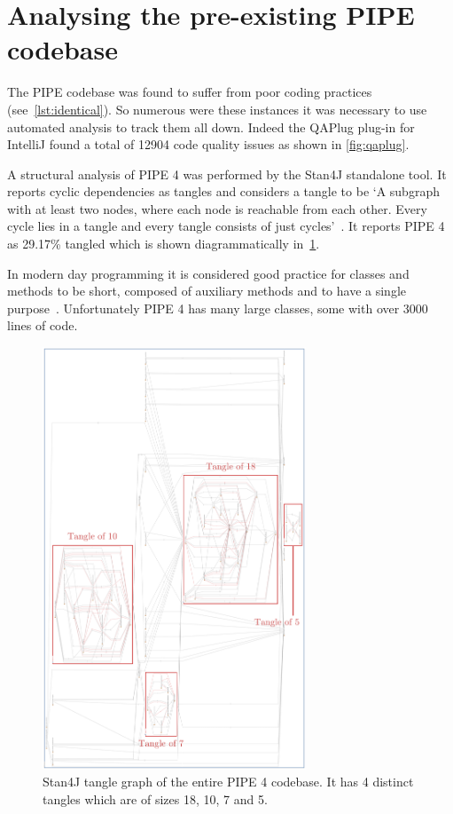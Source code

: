  \section{Analysing the pre-existing PIPE codebase}
The PIPE codebase was found to suffer from poor coding practices (see~\cref{lst:identical}). So numerous were these instances it was necessary to use automated analysis to track them all down. Indeed the QAPlug plug-in for IntelliJ found a total of \num{12904} code quality issues as shown in \cref{fig:qaplug}.

A structural analysis of PIPE 4 was performed by the Stan4J standalone tool. It reports cyclic dependencies as tangles and considers a tangle to be `A subgraph with at least two nodes, where each node is reachable from each other. Every cycle lies in a tangle and every tangle consists of just cycles'~\cite{stan_whitepaper}. It reports PIPE 4 as 29.17\% tangled which is shown diagrammatically in~\cref{fig:tangle}.

In modern day programming it is considered good practice for classes and methods to be short, composed of auxiliary methods and to have a single purpose~\cite{so_can_a_function_be_too_short}. Unfortunately PIPE 4 has many large classes, some with over \num{3000} lines of code. 





\begin{figure}[tb]
\begin{center}
    \includegraphics[width=0.7\textwidth]{analysis/tangle_annotated.png} 
    \caption{Stan4J tangle graph of the entire PIPE 4 codebase. It has 4 distinct tangles which are of sizes 18, 10, 7 and 5.}
    \label{fig:tangle}
\end{center}
\end{figure}
